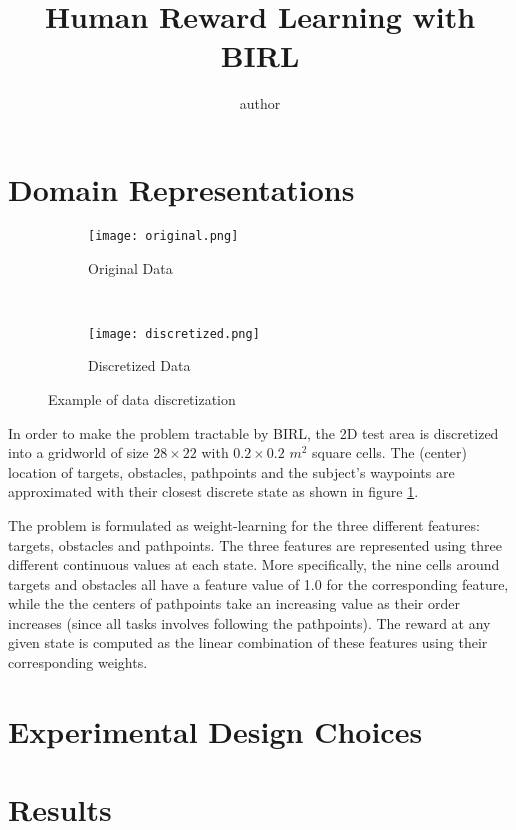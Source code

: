 \documentclass[12pt]{article}
\title{\LARGE \bf  Human Reward Learning with BIRL }
\author{author}
\begin{document}
\thispagestyle{fancy}
    \maketitle
    \pagestyle{fancy}

\section{Domain Representations}

\begin{figure}[h!]
    \centering
    \begin{subfigure}[h]{1\textwidth}
        \centering
        \texttt{[image: original.png]}
        \caption{Original Data}
    \end{subfigure}
    ~ 
    \begin{subfigure}[h]{1\textwidth}
        \centering
        \texttt{[image: discretized.png]}
        \caption{Discretized Data}
    \end{subfigure}
    \caption{Example of data discretization}
    \label{gridworld}
\end{figure}

In order to make the problem tractable by BIRL, the 2D test area is discretized into a gridworld of size $28\times 22$ with $0.2 \times 0.2$ $m^2$ square cells. The (center) location of targets, obstacles,  pathpoints and the subject's waypoints are approximated with their closest discrete state as shown in figure \ref{gridworld}.   \par

The problem is formulated as weight-learning for the three different features: targets, obstacles and pathpoints. The three features are represented using three different continuous values at each state. More specifically, the nine cells around targets and obstacles all have a feature value of 1.0 for the corresponding feature, while the the centers of pathpoints take an increasing value as their order increases (since all tasks involves following the pathpoints). The reward at any given state is computed as the linear combination of these features using their corresponding weights. \par

\section{Experimental Design Choices}

\section{Results}
\end{document}
